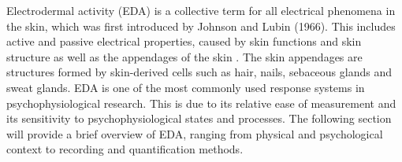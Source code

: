 


Electrodermal activity (EDA) is a collective term for all electrical phenomena in the skin, which was first introduced by Johnson and Lubin (1966). This includes active and passive electrical properties, caused by skin functions and skin structure as well as the appendages of the skin \cite{boucsein2013electrodermal}.%
The skin appendages are structures formed by skin-derived cells such as hair, nails, sebaceous glands and sweat glands. EDA is one of the most commonly used response systems in psychophysiological research. This is due to its relative ease of measurement and its sensitivity to psychophysiological states and processes. The following section will provide a brief overview of EDA, ranging from physical and psychological context to recording and quantification methods.

